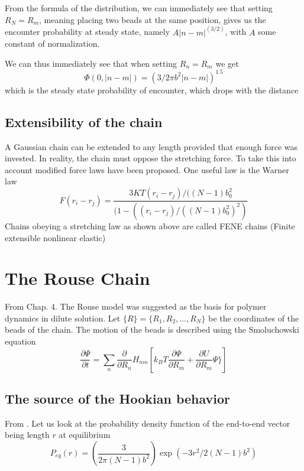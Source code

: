 \documentclass{report}
\begin{document}
From the formula of the distribution, we can immediately see that setting $R_N=R_m$, meaning placing two beads at the same position, gives us the encounter probability at steady state, namely $A|n-m|^(3/2)$, with $A$ some constant of normalization. 

We can thus immediately see that when setting $R_n=R_m$ we get 
\begin{equation*}
\Phi(0,|n-m|)=(3/2\pi b^2 |n-m|)^{1.5}
\end{equation*}
which is the steady state probability of encounter, which drops with the distance


\subsection{Extensibility of the chain}\label{subsection_extensibilitiOfTheChain}
A Gaussian chain can be extended to any length provided that enough force was invested. In reality, the chain must oppose the stretching force. To take this into account modified force laws have been proposed. One useful law is the Warner law
\begin{equation*}
F(r_i -r_j)=\frac{3KT(r_i-r_j)/((N-1)b_0^2}{(1-((r_i-r_j)/((N-1)b_0^2)^2)}
\end{equation*}
Chains obeying a stretching law as shown above are called FENE chains (Finite extensible nonlinear elastic)




\section{The Rouse Chain}\label{section_theRouseChain}
From \cite{doi1986theory} Chap. 4. The Rouse model was suggested as the basis for polymer dynamics in dilute solution. Let $\{R\}=\{R_1,R_2,...,R_N\}$ be the coordinates of the beads of the chain. The motion of the beads is described using the Smoluchowski equation
\begin{equation*}
\frac{\partial \Psi}{\partial t }=\sum_n \frac{\partial}{\partial R_n}H_{nm}\left[k_BT\frac{\partial \Psi}{\partial R_m}+\frac{\partial U}{\partial R_m}\Psi\}\right]
\end{equation*}

\subsection{The source of the Hookian behavior}\label{subsection_sourceOfTheHookianBehavior}
From \cite{bird1987dynamics}. Let us look at the probability density function of the end-to-end vector being length $r$ at equilibrium
\begin{equation*}
P_{eq}(r)= \left(\frac{3}{2\pi (N-1)b^2}\right)\exp(-3r^2/2(N-1)b^2)
\end{equation*}
\end{document}
